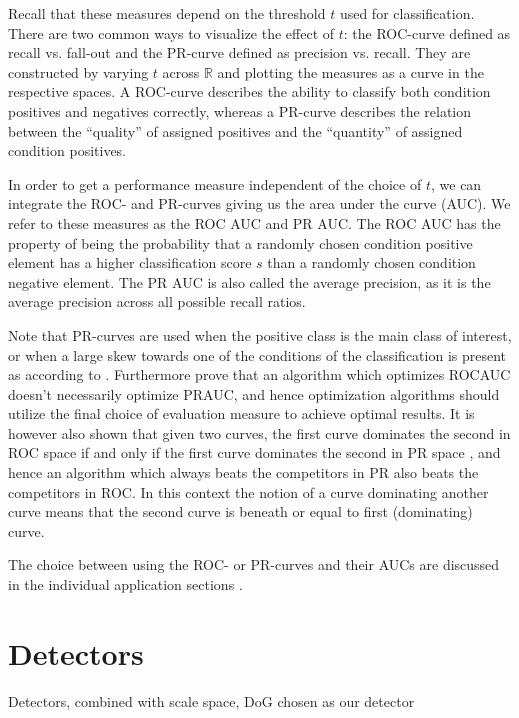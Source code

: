 \documentclass[thesis.tex]{subfiles}
\begin{document}
Recall that these measures depend on the threshold $t$ used for classification. There are two common ways to visualize the effect of $t$: the ROC-curve defined as recall vs. fall-out and the PR-curve defined as precision vs. recall. They are constructed by varying $t$ across $\mathbb{R}$ and plotting the measures as a curve in the respective spaces. A ROC-curve describes the ability to classify both condition positives and negatives correctly, whereas a PR-curve describes the relation between the ``quality'' of assigned positives and the ``quantity'' of assigned condition positives. 

In order to get a performance measure independent of the choice of $t$, we can integrate the ROC- and PR-curves giving us the area under the curve (AUC). We refer to these measures as the ROC AUC and PR AUC. The ROC AUC has the property of being the probability that a randomly chosen condition positive element has a higher classification score $s$ than a randomly chosen condition negative element. The PR AUC is also called the average precision, as it is the average precision across all possible recall ratios.

Note that PR-curves are used when the positive class is the main class of interest, or when a large skew towards one of the conditions of the classification is present as according to \citet{davis2006relationship}. Furthermore \citet{davis2006relationship} prove that an algorithm which optimizes ROCAUC doesn't necessarily optimize PRAUC, and hence optimization algorithms should utilize the final choice of evaluation measure to achieve optimal results. It is however also shown that given two curves, the first curve dominates the second in ROC space if and only if the first curve dominates the second in PR space \cite[Theorem 3.2]{davis2006relationship}, and hence an algorithm which always beats the competitors in PR also beats the competitors in ROC. In this context the notion of a curve dominating another curve means that the second curve is beneath or equal to first (dominating) curve.

The choice between using the ROC- or PR-curves and their AUCs are discussed in the individual application sections .
%
\section{Detectors}
Detectors, combined with scale space, DoG chosen as our detector
\end{document}
